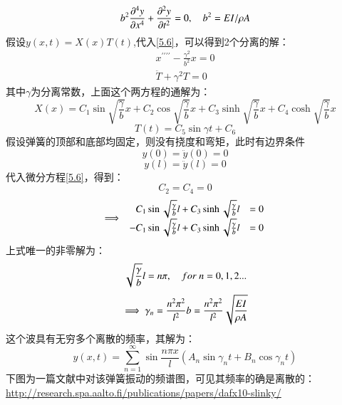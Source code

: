\documentclass[UTF8,9pt]{report}
\begin{document}
\begin{equation}
    b^2\pp[4]{y}{x}+\pp[2]{y}{t}=0,\quad b^2=EI/\rho A \label{5.6}
\end{equation}
假设$y(x,t)=X(x)T(t)$,代入\ref{5.6}，可以得到2个分离的解：
$$\begin{array} { l } { x ^ { \prime \prime \prime \prime } - \frac { \gamma ^ { 2 } } { b ^ { 2 } } x = 0 } \\ { \ddot { T } + \gamma ^ { 2 } T = 0 } \end{array}$$
其中$\gamma$为分离常数，上面这个两方程的通解为：
$$X (x ) =C _ { 1 } \sin \sqrt { \frac { \gamma } {b } }x +C_ { 2 } \cos \sqrt { \frac { \gamma } {b } }x+ C _ { 3 } \sinh \sqrt { \frac { \gamma } {b } }x +C _ { 4 } \cosh \sqrt { \frac { \gamma } {b } }x$$
$$T ( t ) =C _ { 5 }  \sin\gamma t +C_ { 6 }$$
假设弹簧的顶部和底部均固定，则没有挠度和弯矩，此时有边界条件
$$y(0)=\ddot{y}(0)=0$$
$$y(l)=\ddot{y}(l)=0$$
代入微分方程\ref{5.6}，得到：
$$C_2=C_4=0$$
$$\ip \begin{array}{rl}
    C _ { 1 } \sin \sqrt { \frac { \gamma } {b} } l +C _ { 3 } \sinh \sqrt { \frac { \gamma} { b } } l &= 0\\
- C_ { 1 } \sin \sqrt { \frac { \gamma } {b}} l +C _ { 3 } \sinh \sqrt { \frac {\gamma } {b } } l &= 0
\end{array}$$
上式唯一的非零解为：
$$\sqrt{\f{\gamma}{b}}l=n\pi,\quad for\ n=0,1,2...$$
$$\ip \gamma _ {n} = \frac {n^ { 2 } \pi ^ { 2 } } { l ^ { 2 } } b= \frac {n^ { 2 } \pi ^ { 2 } } { l^ { 2 } } \sqrt { \frac { EI} { \rho A} }$$
这个波具有无穷多个离散的频率，其解为：
$$y ( x , t ) = \sum _ { n = 1 } ^ { \infty } \sin \frac { n \pi x } { l } ( A_ { n } \sin \gamma _ { n } t +B_ { n } \cos \gamma _ { n } t )$$
下图为一篇文献中对该弹簧振动的频谱图，可见其频率的确是离散的：\\
\url{http://research.spa.aalto.fi/publications/papers/dafx10-slinky/}
\end{document}
